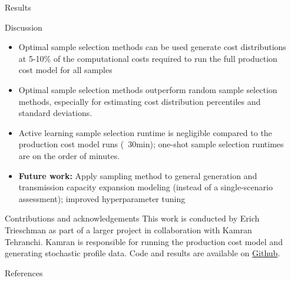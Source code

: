 \documentclass[final]{beamer}
\newlength{\sepwidth}
\newlength{\colwidth}
\newcommand{\separatorcolumn}{\begin{column}{\sepwidth}\end{column}}
\begin{document}
\begin{frame}[t]
\begin{columns}[t]
\begin{column}{\colwidth}
\begin{block}{Results}
  \end{block}
  \vspace*{-10}
  \begin{block}{Discussion}
    \begin{itemize}
      \item Optimal sample selection methods can be used generate cost distributions at 5-10\% of the computational costs required to run the full production cost model for all samples
      \item Optimal sample selection methods outperform random sample selection methods, especially for estimating cost distribution percentiles and standard deviations.
      \item Active learning sample selection runtime is negligible compared to the production cost model runs (~30min); one-shot sample selection runtimes are on the order of minutes.
      \item \textbf{Future work:} Apply sampling method to general generation and transmission capacity expansion modeling (instead of a single-scenario assessment); improved hyperparameter tuning
  \end{itemize}

  \end{block}
  \vspace*{-10}
  \begin{block}{Contributions and acknowledgements}
    This work is conducted by Erich Trieschman as part of a larger project in collaboration with Kamran Tehranchi. Kamran is responsible for running the production cost model and generating stochastic profile data. Code and results are available on \href{https://github.com/etrieschman/grid-planner}{Github}.

  \end{block}
  \vspace*{-10}
  \begin{block}{References}
    \vspace*{-25}
    \nocite{boyd} \nocite{Rasmussen} \nocite{zhang_using_2010}
    \tinysize{\printbibliography[heading=none]}
  \end{block}

\end{column}

\separatorcolumn
\end{columns}
\end{frame}
\end{document}

